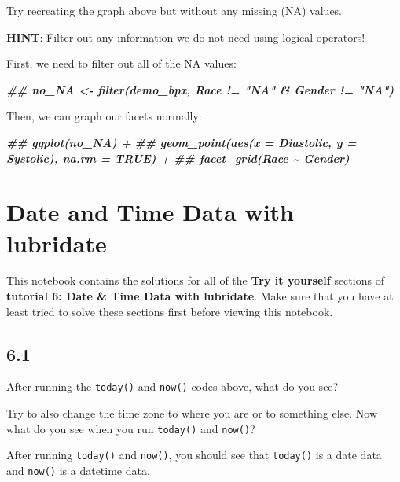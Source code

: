 \documentclass[
]{book}
\newenvironment{Shaded}{\begin{snugshade}}{\end{snugshade}}
\newcommand{\DocumentationTok}[1]{\textcolor[rgb]{0.56,0.35,0.01}{\textbf{\textit{#1}}}}
\begin{document}
Try recreating the graph above but without any missing (NA) values.

\textbf{HINT}: Filter out any information we do not need using logical operators!

First, we need to filter out all of the NA values:

\begin{Shaded}
\begin{Highlighting}[]
\DocumentationTok{\#\# no\_NA \textless{}{-} filter(demo\_bpx, Race != "NA" \& Gender != "NA")}
\end{Highlighting}
\end{Shaded}

Then, we can graph our facets normally:

\begin{Shaded}
\begin{Highlighting}[]
\DocumentationTok{\#\# ggplot(no\_NA) +}
\DocumentationTok{\#\#   geom\_point(aes(x = Diastolic, y = Systolic), na.rm = TRUE) +}
\DocumentationTok{\#\#   facet\_grid(Race \textasciitilde{} Gender)}
\end{Highlighting}
\end{Shaded}

\hypertarget{date-and-time-data-with-lubridate}{%
\section{Date and Time Data with lubridate}\label{date-and-time-data-with-lubridate}}

This notebook contains the solutions for all of the \textbf{Try it yourself} sections of \textbf{tutorial 6: Date \& Time Data with lubridate}. Make sure that you have at least tried to solve these sections first before viewing this notebook.

\hypertarget{section-32}{%
\subsection{6.1}\label{section-32}}

After running the \texttt{today()} and \texttt{now()} codes above, what do you see?

Try to also change the time zone to where you are or to something else. Now what do you see when you run \texttt{today()} and \texttt{now()}?

After running \texttt{today()} and \texttt{now()}, you should see that \texttt{today()} is a date data and \texttt{now()} is a datetime data.
\end{document}
